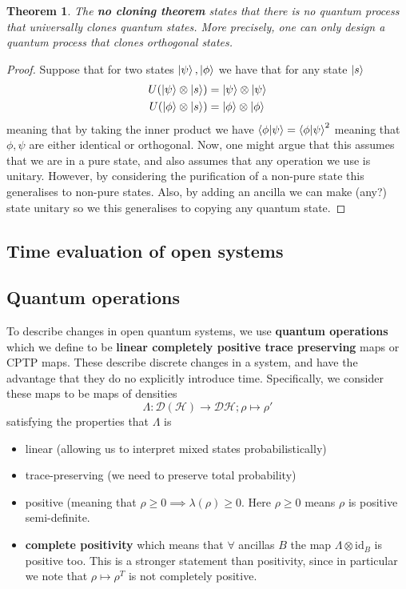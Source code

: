 \documentclass{article}
\newtheorem{theorem}{Theorem}
\theoremstyle{definition}
\newcommand{\id}{\text{id}}
\begin{document}
\begin{theorem}
  The \textbf{no cloning theorem} states that there is no quantum
  process that universally clones quantum states. More precisely,
  one can only design a quantum process that clones orthogonal states.
\end{theorem}
\begin{proof}
  Suppose that for two states $\ket{\psi}, \ket{\phi}$ we have that for any
  state $\ket{s}$ 
  \begin{align*}
    U(\ket{\psi} \otimes \ket{s}) &= \ket{\psi} \otimes \ket{\psi} \\
    U(\ket{\phi} \otimes \ket{s}) &= \ket{\phi} \otimes \ket{\phi}
  \end{align*}
  meaning that by taking the inner product we have $\bra{\phi} \ket{\psi}
  = \bra{\phi} \ket{\psi}^2$ meaning that $\phi, \psi$ are either identical
  or orthogonal. Now, one might argue that this assumes that we are in a pure
  state, and also assumes that any operation we use is unitary. However, 
  by considering the purification of a non-pure state this generalises to
  non-pure states. Also, by adding an ancilla we can make (any?) state unitary
  so we this generalises to copying any quantum state.
\end{proof}

\subsection{Time evaluation of open systems}

\subsection{Quantum operations}

To describe changes in open quantum systems, we use \textbf{quantum operations}
which we define to be \textbf{linear completely positive trace preserving} maps
or CPTP maps. These describe discrete changes in a system, and have the advantage
that they do no explicitly introduce time. Specifically, we consider these maps to
be maps of densities
\begin{equation}
  \Lambda: \mathcal{D}(\mathcal{H}) \to \mathcal{D} \mathcal{H}; \rho \mapsto \rho'
\end{equation}
satisfying the properties that $\Lambda$ is
\begin{itemize}
  \item linear (allowing us to interpret mixed states probabilistically)
  \item trace-preserving (we need to preserve total probability)
  \item positive (meaning that $\rho \geq 0 \implies \lambda(\rho) \geq 0$.
    Here $\rho \geq 0$ means $\rho$ is positive semi-definite.
  \item \textbf{complete positivity} which means that $\forall$ ancillas $B$
    the map $\Lambda \otimes \id_B$ is positive too. This is a stronger statement
    than positivity, since in particular we note that $\rho \mapsto \rho^T$ is not
    completely positive.
\end{itemize}
\end{document}
